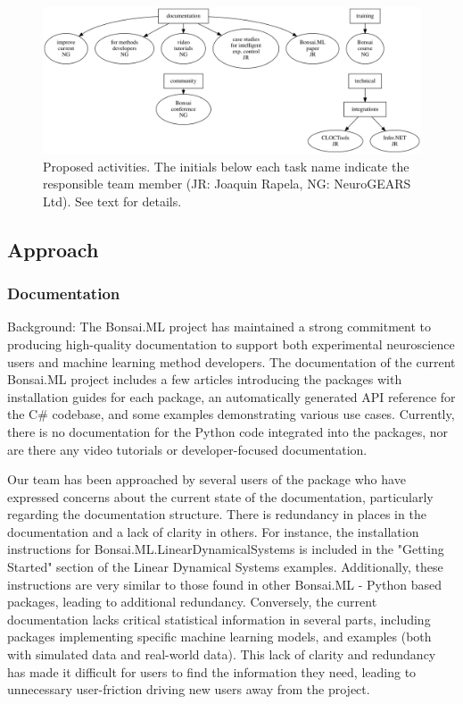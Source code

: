 
\begin{figure}
    \centering
    \includegraphics[width=6in]{activitiesGraphs/activities_larger.png}

    \caption{Proposed activities. The initials below each task name indicate
    the responsible team member (JR: Joaquin Rapela, NG: NeuroGEARS Ltd). See
    text for details.}

\end{figure}

\subsection*{Approach}

\subsubsection*{Documentation}

Background: The Bonsai.ML project has maintained a strong commitment to producing high-quality documentation to support both experimental neuroscience users and machine learning method developers. The documentation of the current Bonsai.ML project includes a few articles introducing the packages with installation guides for each package, an automatically generated API reference for the C\# codebase, and some examples demonstrating various use cases. Currently, there is no documentation for the Python code integrated into the packages, nor are there any video tutorials or developer-focused documentation.

Our team has been approached by several users of the package who have expressed concerns about the current state of the documentation, particularly regarding the documentation structure. There is redundancy in places in the documentation and a lack of clarity in others. For instance, the installation instructions for Bonsai.ML.LinearDynamicalSystems is included in the "Getting Started" section of the Linear Dynamical Systems examples. Additionally, these instructions are very similar to those found in other Bonsai.ML - Python based packages, leading to additional redundancy. Conversely, the current documentation lacks critical statistical information in several parts, including packages implementing specific machine learning models, and examples (both with simulated data and real-world data). This lack of clarity and redundancy has made it difficult for users to find the information they need, leading to unnecessary user-friction driving new users away from the project.

